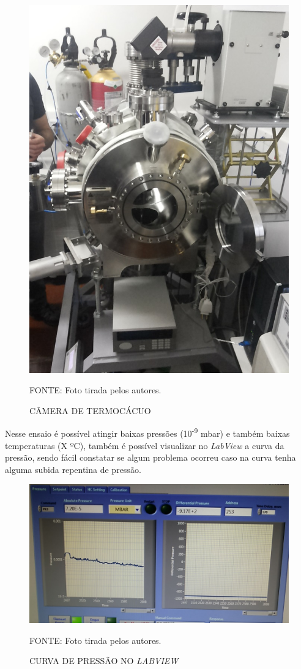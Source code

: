 \documentclass[
	12pt,				%
	openright,			%
	oneside,			%
	a4paper,			%
	english,			%
	french,				%
	spanish,			%
	brazil,				%
	oldfontcommands
	]{abntex2}
\begin{document}
	\begin{figure}[th]
		\caption{CÂMERA DE TERMOCÁCUO}
		\label{Fig_SubConj}
		\centering
		\includegraphics[width=0.5\linewidth]{./figs/termovacuo}
			
		\begin{small}
			FONTE: Foto tirada pelos autores.
		\end{small}		
	\end{figure}
	
	Nesse ensaio é possível atingir baixas pressões (10\textsuperscript{-9} mbar) e também baixas temperaturas (X ºC), também é possível visualizar no \textit{LabView} a curva da pressão, sendo fácil constatar se algum problema ocorreu caso na curva tenha alguma subida repentina de pressão.
	
	\begin{figure}[th]
		\caption{CURVA DE PRESSÃO NO \textit{LABVIEW}}
		\label{Fig_SubConj}
		\centering
		\includegraphics[width=0.7\linewidth]{./figs/labview}
			
		\begin{small}
			FONTE: Foto tirada pelos autores.
		\end{small}		
	\end{figure}
	
\end{document}
